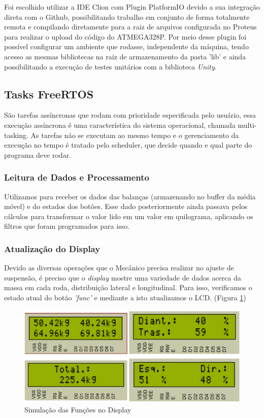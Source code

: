 \documentclass[a4paper, 12pt]{article}
\begin{document}
	Foi escolhido utilizar a IDE Clion com Plugin PlatformIO devido a sua integração direta com o Github, possibilitando trabalho em conjunto de forma totalmente remota e compilando diretamente para a raiz de arquivos configurada no Proteus para realizar o upload do código do ATMEGA328P. Por meio desse plugin foi possível configurar um ambiente que rodasse, independente da máquina, tendo acesso as mesmas bibliotecas na raiz de armazenamento da pasta 'lib' e ainda possibilitando a execução de testes unitários com a biblioteca \textit{Unity}. 
	
	\subsection{Tasks FreeRTOS}
	São tarefas assíncronas que rodam com prioridade especificada pelo usuário, essa execução assíncrona é uma característica do sistema operacional, chamada multi-tasking. As tarefas não se executam ao mesmo tempo e o gerenciamento da execução no tempo é tratado pelo scheduler, que decide quando e qual parte do programa deve rodar.
	
	\subsubsection{Leitura de Dados e Processamento}
	Utilizamos para receber os dados das balanças (armazenando no buffer da média móvel) e do estados dos botões. Esse dado posteriormente ainda passava pelos cálculos para transformar o valor lido em um valor em quilograma, aplicando os filtros que foram programados para isso. 
	
	\subsubsection{Atualização do Display}
	
	Devido as diversas operações que o Mecânico precisa realizar no ajuste de suspensão, é preciso que o \textit{display} mostre uma variedade de dados acerca da massa em cada roda, distribuição lateral e longitudinal. Para isso, verificamos o estado atual do botão \textit{'func'} e mediante a isto atualizamos o LCD. (Figura \ref{fig:operacao})
	
	\begin{figure}[!htb]
		\centering
		\includegraphics[width=.6\linewidth]{operacao}
		\caption{Simulação das Funções no Display}
		\label{fig:operacao}
	\end{figure}
	
\end{document}
